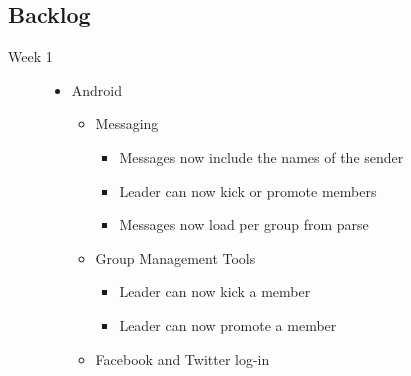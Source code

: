 \subsection{Backlog}
\begin{description}
	\item[Week 1] \hfill
	\begin{itemize}
		\item Android
		\begin{itemize}
			\item Messaging
			\begin{itemize}
				\item Messages now include the names of the sender
				\item Leader can now kick or promote members
				\item Messages now load per group from parse
			\end{itemize}
			\item Group Management Tools
			\begin{itemize}
				\item Leader can now kick a member
				\item Leader can now promote a member
			\end{itemize}
			\item Facebook and Twitter log-in
		\end{itemize}
	\end{itemize}
	

\end{description}
